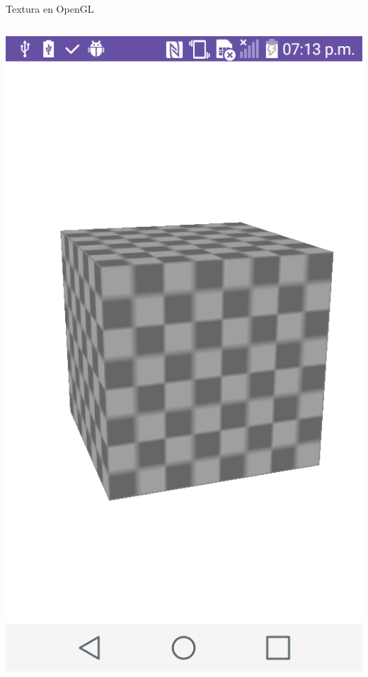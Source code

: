 \documentclass[aspectratio=169,compress]{beamer}
\begin{document}
\begin{frame}{Textura en OpenGL}
\begin{columns}
\begin{column}{0.3\textwidth}
\begin{center}
\includegraphics[width=1.0\linewidth]{PantallazosDemoTaller/Demo08.png}
\end{center}
\end{column}
\end{columns}


\end{frame}
\end{document}
